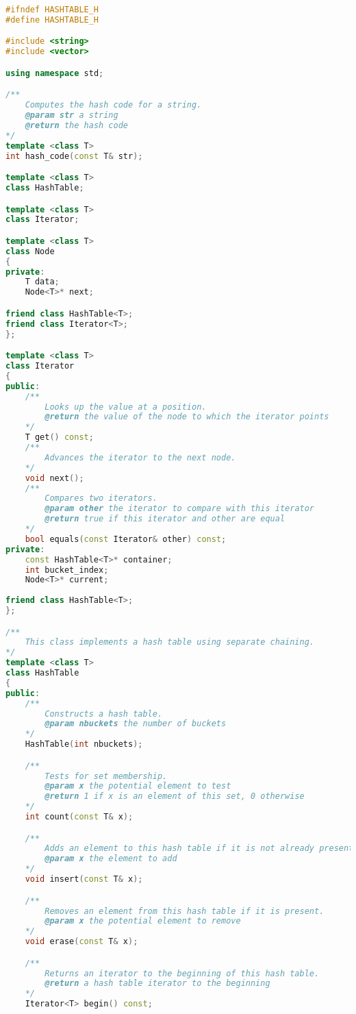 \documentclass[letterpaper, 11pt]{article}
\begin{document}
\begin{lstlisting}[language=c++, caption=hashtable.h]
#ifndef HASHTABLE_H
#define HASHTABLE_H

#include <string>
#include <vector>

using namespace std;

/**
    Computes the hash code for a string.
    @param str a string
    @return the hash code
*/
template <class T>
int hash_code(const T& str);

template <class T>
class HashTable;

template <class T>
class Iterator;

template <class T>
class Node
{
private:
    T data;
    Node<T>* next;

friend class HashTable<T>;
friend class Iterator<T>;
};

template <class T>
class Iterator
{
public:
    /**  
        Looks up the value at a position.
        @return the value of the node to which the iterator points
    */
    T get() const;
    /**
        Advances the iterator to the next node.
    */
    void next();
    /**
        Compares two iterators.
        @param other the iterator to compare with this iterator
        @return true if this iterator and other are equal
    */
    bool equals(const Iterator& other) const;
private:
    const HashTable<T>* container;
    int bucket_index;
    Node<T>* current;
    
friend class HashTable<T>;
};

/**
    This class implements a hash table using separate chaining.
*/
template <class T>
class HashTable
{
public:
    /**
        Constructs a hash table.
        @param nbuckets the number of buckets
    */
    HashTable(int nbuckets);

    /**
        Tests for set membership.
        @param x the potential element to test
        @return 1 if x is an element of this set, 0 otherwise
    */
    int count(const T& x);

    /**
        Adds an element to this hash table if it is not already present.
        @param x the element to add
    */
    void insert(const T& x);

    /**
        Removes an element from this hash table if it is present.
        @param x the potential element to remove
    */
    void erase(const T& x);

    /**
        Returns an iterator to the beginning of this hash table.
        @return a hash table iterator to the beginning
    */
    Iterator<T> begin() const;


\end{lstlisting}
\end{document}
